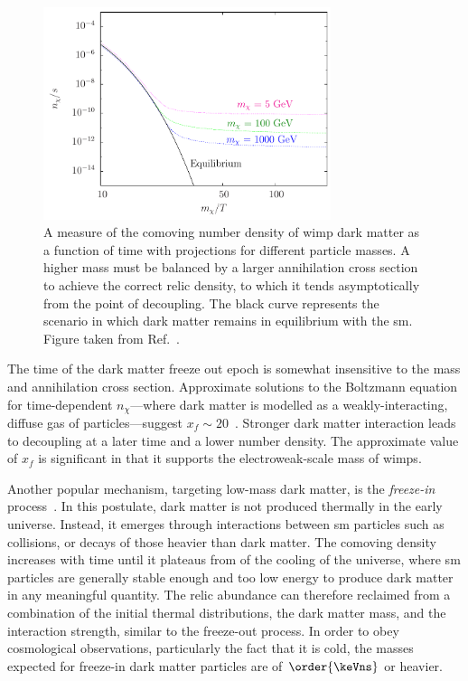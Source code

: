 \begin{figure}[htbp]
    \centering
    \includegraphics[width=0.75\textwidth]{figures/dm_abundance.pdf}
    \caption[A measure of the comoving number density of \acrshort{wimp} dark matter as a function of time with projections for different particle masses]{A measure of the comoving number density of \acrshort{wimp} dark matter as a function of time with projections for different particle masses. A higher mass must be balanced by a larger annihilation cross section to achieve the correct relic density, to which it tends asymptotically from the point of decoupling. The black curve represents the scenario in which dark matter remains in equilibrium with the \acrlong{sm}. Figure taken from Ref.~.}
    \label{fig:theory_dm_abundance}
\end{figure}

The time of the dark matter freeze out epoch is somewhat insensitive to the mass and annihilation cross section. Approximate solutions to the Boltzmann equation for time-dependent $n_{\chi}$---where dark matter is modelled as a weakly-interacting, diffuse gas of particles---suggest $x_f \sim \text{20}$~\cite{Lisanti:2016jxe,Bender:2012gc}. Stronger dark matter interaction leads to decoupling at a later time and a lower number density. The approximate value of $x_f$ is significant in that it supports the electroweak-scale mass of \glspl{wimp}.

Another popular mechanism, targeting low-mass dark matter, is the \emph{freeze-in} process~\cite{Hall:2009bx,Krnjaic:2017tio}. In this postulate, dark matter is not produced thermally in the early universe. Instead, it emerges through interactions between \acrshort{sm} particles such as collisions, or decays of those heavier than dark matter. The comoving density increases with time until it plateaus from of the cooling of the universe, where \acrshort{sm} particles are generally stable enough and too low energy to produce dark matter in any meaningful quantity. The relic abundance can therefore reclaimed from a combination of the initial thermal distributions, the dark matter mass, and the interaction strength, similar to the freeze-out process. In order to obey cosmological observations, particularly the fact that it is cold, the masses expected for freeze-in dark matter particles are of $\order{\keVns}$ or heavier.


